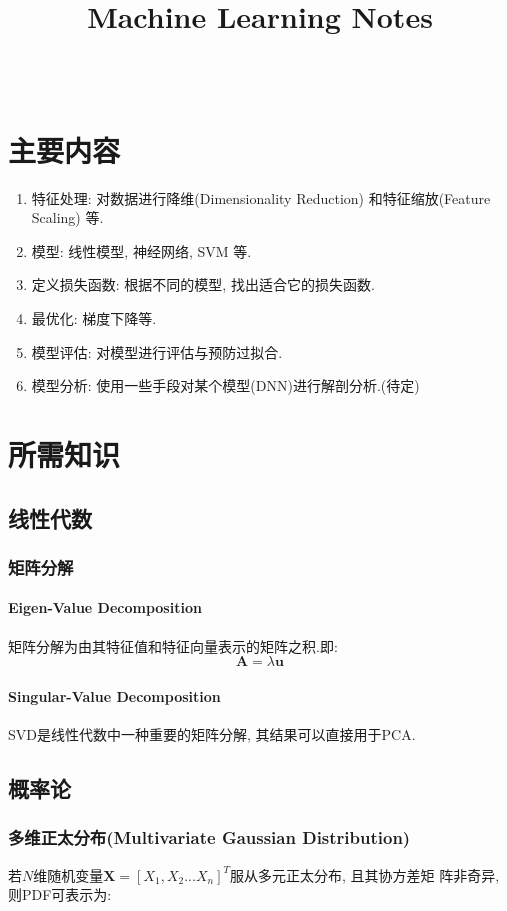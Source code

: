 \documentclass[oneside]{book}
\title{\titlteFont Machine Learning Notes}
\author{\authorFont{Jiang Tao}\\ \NovaMonoFont{vix2018@gmail.com}}
\date{\NovaMonoFont 2019}
\begin{document}
	\begin{titlepage}
		\maketitle
	\end{titlepage}
	\tableofcontents
	\setcounter{chapter}{0}
	\renewcommand{\thechapter}{\roman{chapter}}
	\chapter{主要内容}
			\begin{enumerate} 
				\item 特征处理: 对数据进行降维(Dimensionality Reduction) 和特征缩放(Feature Scaling) 等.
				\item 模型: 线性模型, 神经网络, SVM 等.
				\item 定义损失函数: 根据不同的模型, 找出适合它的损失函数.
				\item 最优化: 梯度下降等.
				\item 模型评估: 对模型进行评估与预防过拟合.
				\item 模型分析: 使用一些手段对某个模型(DNN)进行解剖分析.(待定)
			\end{enumerate}
	\chapter{所需知识}
		\section{线性代数}
			\subsection{矩阵分解}
				\subsubsection{Eigen-Value Decomposition}
					矩阵分解为由其特征值和特征向量表示的矩阵之积.即:
					$$\boldsymbol{A} = \lambda \boldsymbol{u}$$
				\subsubsection{Singular-Value Decomposition}
					SVD是线性代数中一种重要的矩阵分解, 其结果可以直接用于PCA.				
		\section{概率论}
			\subsection{多维正太分布(Multivariate Gaussian Distribution)}	
				若$N$维随机变量$\boldsymbol{X}= [X_{1}, X_{2} ... X_{n}]^{T}$服从多元正太分布, 且其协方差矩
				阵非奇异, 则PDF可表示为:
\end{document}
